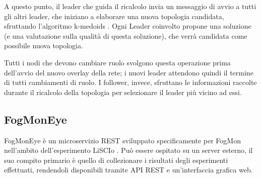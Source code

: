         A questo punto, il leader che guida il ricalcolo invia un messaggio di avvio a tutti gli altri leader, che iniziano a elaborare
        una nuova topologia candidata, sfruttando l'algoritmo k-medoids \cite {k-medoids}. Ogni Leader coinvolto propone una soluzione (e una valutazione sulla qualità di questa soluzione), che verrà candidata come possibile nuova topologia. 
        
        Tutti i nodi che devono cambiare ruolo svolgono questa operazione prima dell'avvio del nuovo overlay della rete; i nuovi leader attendono quindi il termine di tutti cambiamenti di ruolo. I follower, invece, sfruttano le informazioni raccolte durante il ricalcolo della topologia per selezionare il leader più vicino ad essi.
        
        
        \subsection{FogMonEye}
        FogMonEye \cite{FogMonEye} è un microservizio REST sviluppato specificamente per FogMon nell'ambito dell'esperimento LiSCIo \cite{FogMon}. Può essere ospitato su un server esterno, il suo compito primario è quello di collezionare i risultati degli esperimenti effettuati, rendendoli disponibili tramite API REST e un'interfaccia grafica web.
        
